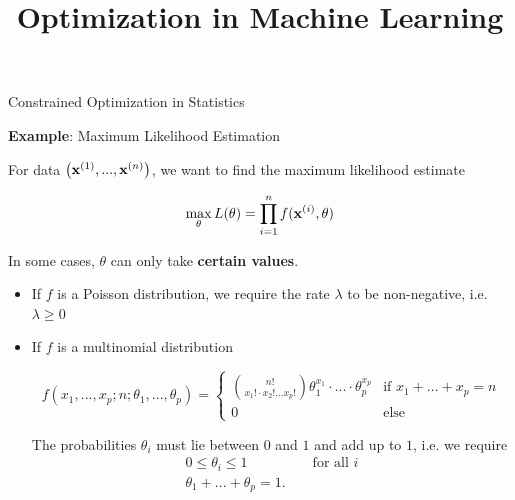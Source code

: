 \documentclass[11pt,compress,t,notes=noshow, xcolor=table]{beamer}
\title{Optimization in Machine Learning}
\date{}
\begin{document}
\sloppy
\begin{vbframe}{Constrained Optimization in Statistics}

\textbf{Example}: Maximum Likelihood Estimation

\lz

For data $\left(\mathbf{x}^{(1)}, ..., \mathbf{x}^{(n)}\right)$, we want to find the maximum likelihood estimate

$$
\max_\theta L(\theta) = \prod_{i = 1}^n f(\mathbf{x}^{(i)}, \theta)
$$

In some cases, $\theta$ can only take \textbf{certain values}. 

\lz 

\begin{itemize}
\item If $f$ is a Poisson distribution, we require the rate $\lambda$ to be non-negative, i.e. $\lambda \ge 0$

  \item If $f$ is a multinomial distribution

\begin{footnotesize}
  $$
  f(x_1, ..., x_p; n; \theta_1, ..., \theta_p) = \begin{cases} \binom{n!}{x_1! \cdot x_2! ... x_p!} \theta_1^{x_1} \cdot ... \cdot \theta_p^{x_p} & \text{if } x_1 + ... + x_p = n \\ 0 & \text{else}
  \end{cases}
  $$
\end{footnotesize}

  The probabilities $\theta_i$ must lie between $0$ and $1$ and add up to $1$, i.e. we require 
  \begin{eqnarray*}
  	0 \le \theta_i \le 1 && \text{ for all } i \\
  	 \theta_1 + ... + \theta_p = 1. &&
  \end{eqnarray*}

\end{itemize}

\end{vbframe}
\end{document}
